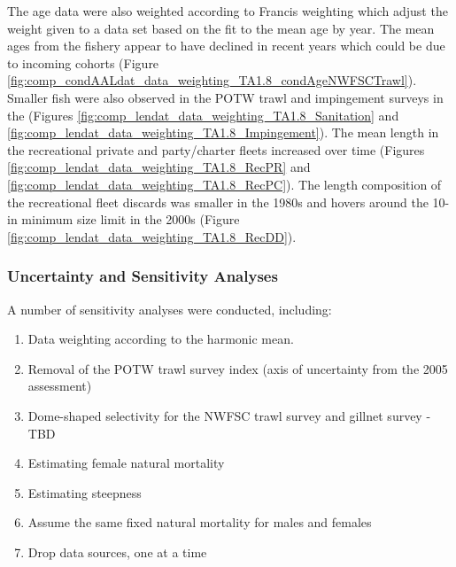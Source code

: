 \documentclass[12pt,]{article}
\begin{document}
The age data were also weighted according to Francis weighting which
adjust the weight given to a data set based on the fit to the mean age
by year. The mean ages from the fishery appear to have declined in
recent years which could be due to incoming cohorts (Figure
\ref{fig:comp_condAALdat_data_weighting_TA1.8_condAgeNWFSCTrawl}).\\
Smaller fish were also observed in the POTW trawl and impingement
surveys in the (Figures
\ref{fig:comp_lendat_data_weighting_TA1.8_Sanitation} and
\ref{fig:comp_lendat_data_weighting_TA1.8_Impingement}). The mean length
in the recreational private and party/charter fleets increased over time
(Figures \ref{fig:comp_lendat_data_weighting_TA1.8_RecPR} and
\ref{fig:comp_lendat_data_weighting_TA1.8_RecPC}). The length
composition of the recreational fleet discards was smaller in the 1980s
and hovers around the 10-in minimum size limit in the 2000s (Figure
\ref{fig:comp_lendat_data_weighting_TA1.8_RecDD}).

\subsubsection{Uncertainty and Sensitivity
Analyses}\label{uncertainty-and-sensitivity-analyses}

A number of sensitivity analyses were conducted, including:

\begin{enumerate}

  \item Data weighting according to the harmonic mean.
  
  \item Removal of the POTW trawl survey index (axis of uncertainty from the 2005 assessment)
  
  \item Dome-shaped selectivity for the NWFSC trawl survey and gillnet survey - TBD
  
  \item Estimating female natural mortality
  
  \item Estimating steepness
  
  \item Assume the same fixed natural mortality for males and females
  
  \item Drop data sources, one at a time
  
  
\end{enumerate}
\end{document}
